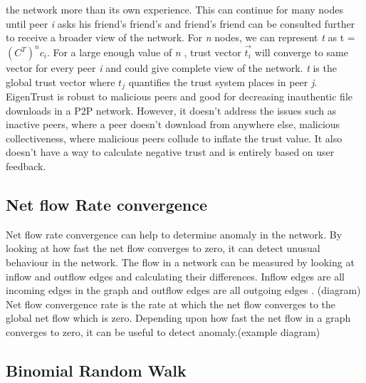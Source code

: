 the network more than its own experience. This can continue for many nodes until peer 
\textit{i} asks his friend's friend's and friend's friend can be consulted further to 
receive a broader view of the network. For \textit{n} nodes, we can represent \textit{t}
as t = $(C^T)^n c_{i}$. For a large enough value of \textit{n} , trust vector 
$\vec{t_{i}}$ will converge to same vector for every peer \textit{i} and could give 
complete view of the network. 
\textit{t} is the global trust vector where $t_{j}$ quantifies the trust system places in 
peer \textit{j}. 
EigenTrust is robust to malicious peers and good for decreasing inauthentic file downloads 
in a P2P network. However, it doesn't address the issues such as inactive peers, where a 
peer doesn't download from anywhere else, malicious collectiveness, where malicious peers 
collude to inflate the trust value. It also doesn't have a way to calculate negative trust 
and is entirely based on user feedback. \cite{kamvar2003eigentrust}



\subsection{Net flow Rate convergence}
Net flow rate convergence can help to determine anomaly in the network. By looking at how 
fast the net flow converges to zero, it can detect unusual behaviour in the network. 
The flow in a network can be measured by looking at inflow and outflow edges and 
calculating their differences. Inflow edges are all incoming edges in the graph and 
outflow edges are all outgoing edges . (diagram) Net flow convergence rate is the rate at which the net flow converges to the global net flow which is zero. 
Depending upon how fast the net flow in a graph converges to zero, it can be useful to 
detect anomaly.(example diagram) 


\subsection{Binomial Random Walk}

